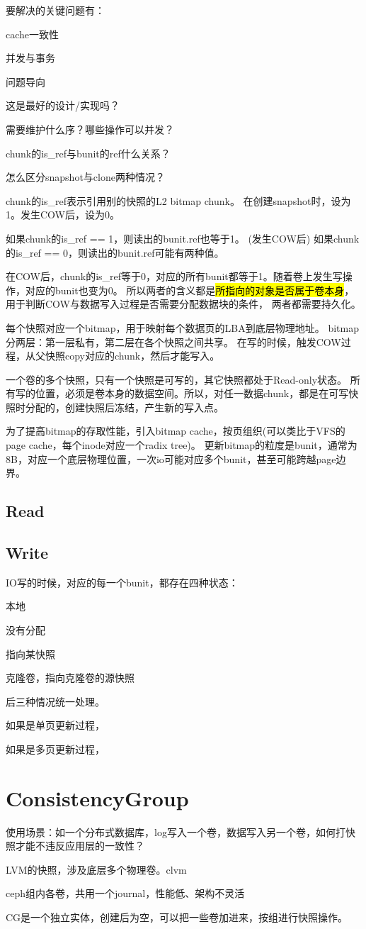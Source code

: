 要解决的关键问题有：
\begin{enumbox}
\item cache一致性
\item 并发与事务
\end{enumbox}

问题导向
\begin{enumbox}
\item 这是最好的设计/实现吗？
\item 需要维护什么序？哪些操作可以并发？
\item chunk的is\_ref与bunit的ref什么关系？
\item 怎么区分snapshot与clone两种情况？
\end{enumbox}

chunk的is\_ref表示引用别的快照的L2 bitmap chunk。
在创建snapshot时，设为1。发生COW后，设为0。

如果chunk的is\_ref == 1，则读出的bunit.ref也等于1。
(发生COW后)
如果chunk的is\_ref == 0，则读出的bunit.ref可能有两种值。

在COW后，chunk的is\_ref等于0，对应的所有bunit都等于1。随着卷上发生写操作，对应的bunit也变为0。
所以两者的含义都是\hl{所指向的对象是否属于卷本身}，用于判断COW与数据写入过程是否需要分配数据块的条件，
两者都需要持久化。

每个快照对应一个bitmap，用于映射每个数据页的LBA到底层物理地址。
bitmap分两层：第一层私有，第二层在各个快照之间共享。
在写的时候，触发COW过程，从父快照copy对应的chunk，然后才能写入。

一个卷的多个快照，只有一个快照是可写的，其它快照都处于Read-only状态。
所有写的位置，必须是卷本身的数据空间。所以，对任一数据chunk，都是在可写快照时分配的，创建快照后冻结，产生新的写入点。

为了提高bitmap的存取性能，引入bitmap cache，按页组织(可以类比于VFS的page cache，每个inode对应一个radix tree)。
更新bitmap的粒度是bunit，通常为8B，对应一个底层物理位置，一次io可能对应多个bunit，甚至可能跨越page边界。

\subsection{Read}

\subsection{Write}

IO写的时候，对应的每一个bunit，都存在四种状态：
\begin{enumbox}
\item 本地
\item 没有分配
\item 指向某快照
\item 克隆卷，指向克隆卷的源快照
\end{enumbox}

后三种情况统一处理。

如果是单页更新过程，

如果是多页更新过程，

\section{ConsistencyGroup}

使用场景：如一个分布式数据库，log写入一个卷，数据写入另一个卷，如何打快照才能不违反应用层的一致性？

LVM的快照，涉及底层多个物理卷。clvm

ceph组内各卷，共用一个journal，性能低、架构不灵活

CG是一个独立实体，创建后为空，可以把一些卷加进来，按组进行快照操作。
